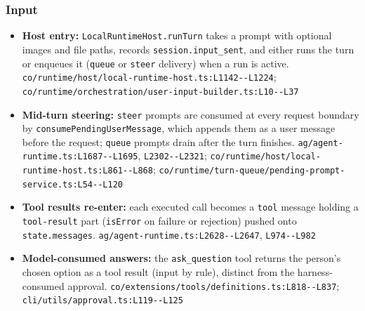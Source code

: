 \subsubsection*{Input}
\begin{itemize}
\item \textbf{Host entry:} \texttt{LocalRuntimeHost.\allowbreak{}runTurn} takes a prompt with optional images and file paths, records \texttt{session.\allowbreak{}input\_\allowbreak{}sent}, and either runs the turn or enqueues it (\texttt{queue} or \texttt{steer} delivery) when a run is active. \texttt{co/\allowbreak{}runtime/\allowbreak{}host/\allowbreak{}local-\allowbreak{}runtime-\allowbreak{}host.\allowbreak{}ts:\allowbreak{}L1142-\allowbreak{}-\allowbreak{}L1224}; \texttt{co/\allowbreak{}runtime/\allowbreak{}orchestration/\allowbreak{}user-\allowbreak{}input-\allowbreak{}builder.\allowbreak{}ts:\allowbreak{}L10-\allowbreak{}-\allowbreak{}L37}
\item \textbf{Mid-turn steering:} \texttt{steer} prompts are consumed at every request boundary by \texttt{consumePendingUserMessage}, which appends them as a user message before the request; \texttt{queue} prompts drain after the turn finishes. \texttt{ag/\allowbreak{}agent-\allowbreak{}runtime.\allowbreak{}ts:\allowbreak{}L1687-\allowbreak{}-\allowbreak{}L1695}, \texttt{L2302-\allowbreak{}-\allowbreak{}L2321}; \texttt{co/\allowbreak{}runtime/\allowbreak{}host/\allowbreak{}local-\allowbreak{}runtime-\allowbreak{}host.\allowbreak{}ts:\allowbreak{}L861-\allowbreak{}-\allowbreak{}L868}; \texttt{co/\allowbreak{}runtime/\allowbreak{}turn-\allowbreak{}queue/\allowbreak{}pending-\allowbreak{}prompt-\allowbreak{}service.\allowbreak{}ts:\allowbreak{}L54-\allowbreak{}-\allowbreak{}L120}
\item \textbf{Tool results re-enter:} each executed call becomes a \texttt{tool} message holding a \texttt{tool-\allowbreak{}result} part (\texttt{isError} on failure or rejection) pushed onto \texttt{state.\allowbreak{}messages}. \texttt{ag/\allowbreak{}agent-\allowbreak{}runtime.\allowbreak{}ts:\allowbreak{}L2628-\allowbreak{}-\allowbreak{}L2647}, \texttt{L974-\allowbreak{}-\allowbreak{}L982}
\item \textbf{Model-consumed answers:} the \texttt{ask\_\allowbreak{}question} tool returns the person's chosen option as a tool result (input by rule), distinct from the harness-consumed approval. \texttt{co/\allowbreak{}extensions/\allowbreak{}tools/\allowbreak{}definitions.\allowbreak{}ts:\allowbreak{}L818-\allowbreak{}-\allowbreak{}L837}; \texttt{cli/\allowbreak{}utils/\allowbreak{}approval.\allowbreak{}ts:\allowbreak{}L119-\allowbreak{}-\allowbreak{}L125}
\end{itemize}

